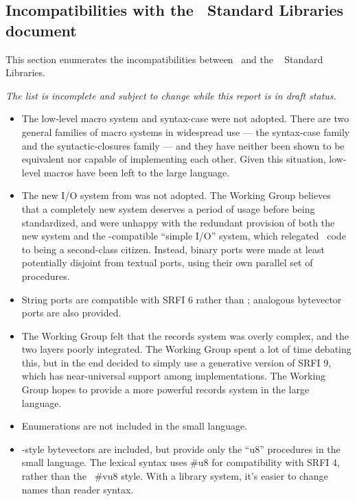 \subsection*{Incompatibilities with the \rsixrs\ Standard Libraries document}

This section enumerates the incompatibilities between \rsevenrs\ and
the \rsixrs~\cite{R6RS} Standard Libraries.

{\em The list is incomplete and subject to change while this report is in draft status.}

\begin{itemize}

\item The low-level macro system and {\cf syntax-case} were not adopted. There
are two general families of macro systems in widespread use --- the
{\cf syntax-case} family and the {\cf syntactic-closures} family --- and they have
neither been shown to be equivalent nor capable of implementing each
other. Given this situation,
low-level macros have been left to the large language.

\item The new I/O system from \rsixrs was not adopted. The Working Group believes that a completely new
system deserves a period of usage before being standardized, and were
unhappy with the redundant
provision of both the new system and the \rfivers{}-compatible ``simple I/O''
system, which
relegated \rfivers\ code to being a second-class
citizen.  Instead, binary ports were made at least potentially disjoint from
textual ports, using their own parallel set of procedures.

\item String ports are compatible with SRFI 6 rather than \rsixrs; analogous
bytevector ports are also provided.

\item The Working Group felt that the \rsixrs{} records system was overly complex, and the two layers
poorly integrated. The Working Group spent a lot of time debating this, but in the
end decided to simply use a generative version of SRFI 9, which has
near-universal support among implementations. The Working Group hopes to provide a more
powerful records system in the large language.

\item Enumerations are not included in the small language.

\item \rsixrs{}-style bytevectors are included, but provide only the ``u8'' procedures in the small
language.  The lexical syntax uses {\cf \#u8} for compatibility
with SRFI 4, rather than the \rsixrs~{\cf \#vu8} style.
With a library system, it's easier to change names than reader syntax.


\end{itemize}
